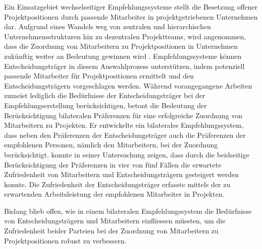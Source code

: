 Ein Einsatzgebiet wechselseitiger Empfehlungssysteme stellt die Besetzung offener Projektpositionen durch passende Mitarbeiter in projektgetriebenen Unternehmen dar.
Aufgrund eines Wandels weg von zentralen und hierarchischen Unternehmensstrukturen hin zu dezentralen Projektteams, wird angenommen, dass die Zuordnung von Mitarbeitern zu Projektpositionen in Unternehmen zukünftig weiter an Bedeutung gewinnen wird \cite[S .iii]{link:booklet}. %
Empfehlungssysteme können Entscheidungsträger in diesem Auswahlprozess unterstützen, indem potenziell passende Mitarbeiter für Projektpositionen ermittelt und den Entscheidungsträgern vorgeschlagen werden.
Während vorangegangene Arbeiten zumeist lediglich die Bedürfnisse der Entscheidungsträger bei der Empfehlungserstellung berücksichtigen, betont \textcite[S. iii]{link:booklet} die Bedeutung der Berücksichtigung bilateralen Präferenzen für eine erfolgreiche Zuordnung von Mitarbeitern zu Projekten.
Er entwickelte ein bilaterales Empfehlungssystem, dass neben den Präferenzen der Entscheidungsträger auch die Präferenzen der empfohlenen Personen, nämlich den Mitarbeitern, bei der Zuordnung berücksichtigt.
\textcite[S. iii]{link:booklet} konnte in seiner Untersuchung zeigen, dass durch die beidseitige Berücksichtigung der Präferenzen in vier von fünf Fällen die erwartete Zufriedenheit von Mitarbeitern und Entscheidungsträgern gesteigert werden konnte.
Die Zufriedenheit der Entscheidungsträger erfasste \textcite[S. iii]{link:booklet} mittels der zu erwartenden Arbeitsleistung der empfohlenen Mitarbeiter in Projekten.

Bislang blieb offen, wie in einem bilateralen Empfehlungssystem die Bedürfnisse von Entscheidungsträgern und Mitarbeitern einfliessen müssten, um die Zufriedenheit beider Parteien bei der Zuordnung von Mitarbeitern zu Projektpositionen robust zu verbessern.


